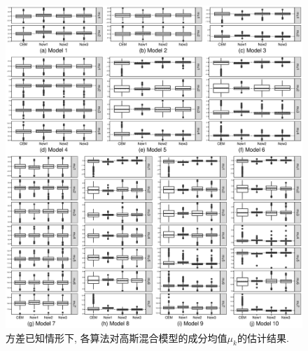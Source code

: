 \documentclass[a4paper,12pt,openany,oneside,utf-8]{ctexbook}
\begin{document}
\begin{figure}[p]
  \centering
  \includegraphics[width = 1\textwidth]{Figure_3_Estimates_for_the_component_means_for_normal_mixture_models_with_known_sigma.eps}
  \caption{方差已知情形下, 各算法对高斯混合模型的成分均值$\mu_k$的估计结果.}
  \label{fig:Estimates for the component parameters for normal mixture models 1-10 with known sigma based on 500 replicates} %
\end{figure}
\end{document}
